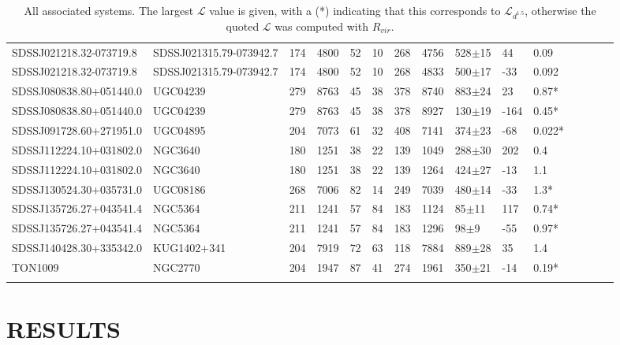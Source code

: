 \documentclass[twocolumn,tighten]{aastex6}
\begin{document}
\begin{table}[ht]
\begin{center}
\begin{tabular}{l l l l l l l l l l l l l l l}
SDSSJ021218.32-073719.8  &  SDSSJ021315.79-073942.7  &  174  &  4800  &  52  &  10  &  268  &  4756  &  528$\pm$15  &  44  &  0.09  \\
SDSSJ021218.32-073719.8  &  SDSSJ021315.79-073942.7  &  174  &  4800  &  52  &  10  &  268  &  4833  &  500$\pm$17  &  -33  &  0.092  \\
SDSSJ080838.80+051440.0  &  UGC04239  &  279  &  8763  &  45  &  38  &  378  &  8740  &  883$\pm$24  &  23  &  0.87*  \\
SDSSJ080838.80+051440.0  &  UGC04239  &  279  &  8763  &  45  &  38  &  378  &  8927  &  130$\pm$19  &  -164  &  0.45*  \\
SDSSJ091728.60+271951.0  &  UGC04895  &  204  &  7073  &  61  &  32  &  408  &  7141  &  374$\pm$23  &  -68  &  0.022*  \\
SDSSJ112224.10+031802.0  &  NGC3640  &  180  &  1251  &  38  &  22  &  139  &  1049  &  288$\pm$30  &  202  &  0.4  \\
SDSSJ112224.10+031802.0  &  NGC3640  &  180  &  1251  &  38  &  22  &  139  &  1264  &  424$\pm$27  &  -13  &  1.1  \\
SDSSJ130524.30+035731.0  &  UGC08186  &  268  &  7006  &  82  &  14  &  249  &  7039  &  480$\pm$14  &  -33  &  1.3*  \\
SDSSJ135726.27+043541.4  &  NGC5364  &  211  &  1241  &  57  &  84  &  183  &  1124  &  85$\pm$11  &  117  &  0.74*  \\
SDSSJ135726.27+043541.4  &  NGC5364  &  211  &  1241  &  57  &  84  &  183  &  1296  &  98$\pm$9  &  -55  &  0.97*  \\
SDSSJ140428.30+335342.0  &  KUG1402+341  &  204  &  7919  &  72  &  63  &  118  &  7884  &  889$\pm$28  &  35  &  1.4  \\
TON1009  &  NGC2770  &  204  &  1947  &  87  &  41  &  274  &  1961  &  350$\pm$21  &  -14  &  0.19*  \\

 \\
\hline
\end{tabular}
\end{center}
  \caption{\small{All associated systems. The largest $\mathcal{L}$ value is given, with a (\**) indicating that this corresponds to $\mathcal{L}_{d^{1.5}}$, otherwise the quoted $\mathcal{L}$ was computed with $R_{vir}$.}}
  \label{target_table}
\end{table}


\section{RESULTS}
\end{document}
